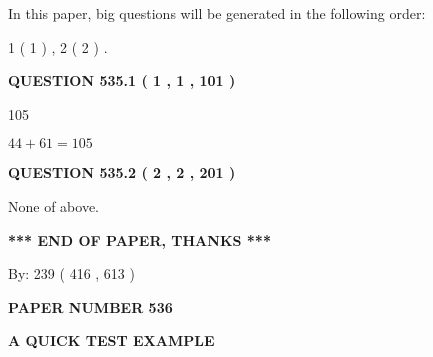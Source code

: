 \documentclass[12pt]{article}
\begin{document}
In this paper, big questions will be generated in the following order: 
   
   
   1 ( 1 )
 ,
   2 ( 2 )
 .
  
\vspace{0.2in}
  
{\textbf{\Large{QUESTION
535.1 
 ( 1 , 1 , 101 )
}}}
  
  
 
 
\noindent{}

105
 
 
 
 
\noindent{}

$ %
44 +  %
61=   %
105$
 
 
  
\vspace{0.2in}
  
{\textbf{\Large{QUESTION
535.2 
 ( 2 , 2 , 201 )
}}}
  
  
 
 
\noindent{}
 
 
 None of above.
 
 
 
 
   
   
 \vspace{0.2in}
 
   
   
   
   
\vspace{1.0in} 
{\textbf{\large{ *** END OF PAPER, THANKS *** }}} 
   
   
\hspace{1.0in} By: 
 239 ( 416 ,  613 )
   
   
   
   
\newpage 
\setcounter{page}{ 
   536001 } 
   
   
   
   
 {\textbf{ \Large{ PAPER NUMBER  536  }}}
   
   
\vspace{0.2in}
   
   
   
   
   
   
 \vspace{0.2in}
{\LARGE {\textbf{ A QUICK TEST EXAMPLE}}}
   
\end{document}
